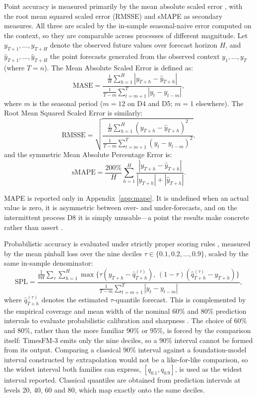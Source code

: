 \documentclass[article]{ajs}
\providecommand{\appendixref}[1]{Appendix~\ref{#1}}
\begin{document}
Point accuracy is measured primarily by the mean absolute scaled error
\citep[MASE;][]{hyndman2006mase}, with the root mean squared scaled error (RMSSE) and sMAPE
as secondary measures. All three are scaled by the in-sample seasonal-naive error computed on
the context, so they are comparable across processes of different magnitude.
Let $y_{T+1}, \dots, y_{T+H}$ denote the observed future values over forecast horizon $H$, and
$\hat{y}_{T+1}, \dots, \hat{y}_{T+H}$ the point forecasts generated from the observed context $y_1, \dots, y_T$
(where $T = n$). The Mean Absolute Scaled Error is defined as:
\begin{equation}
\label{eq:mase}
\text{MASE} = \frac{\frac{1}{H}\sum_{h=1}^H |y_{T+h} - \hat{y}_{T+h}|}{\frac{1}{T-m}\sum_{t=m+1}^T |y_t - y_{t-m}|},
\end{equation}
where $m$ is the seasonal period ($m = 12$ on D4 and D5; $m = 1$ elsewhere). The Root Mean Squared Scaled
Error is similarly:
\begin{equation}
\label{eq:rmsse}
\text{RMSSE} = \sqrt{\frac{\frac{1}{H}\sum_{h=1}^H (y_{T+h} - \hat{y}_{T+h})^2}{\frac{1}{T-m}\sum_{t=m+1}^T (y_t - y_{t-m})^2}},
\end{equation}
and the symmetric Mean Absolute Percentage Error is:
\begin{equation}
\label{eq:smape}
\text{sMAPE} = \frac{200\%}{H} \sum_{h=1}^H \frac{|y_{T+h} - \hat{y}_{T+h}|}{|y_{T+h}| + |\hat{y}_{T+h}|}.
\end{equation}

MAPE is reported only in \appendixref{app:mape}. It is undefined when an actual value is zero,
it is asymmetric between over- and under-forecasts, and on the intermittent process D8 it is
simply unusable---a point the results make concrete rather than assert
\citep{hyndman2006mase, kolassa2016count}.

Probabilistic accuracy is evaluated under strictly proper scoring rules \citep{gneiting2007scoring},
measured by the mean pinball loss over the nine deciles $\tau \in \{0.1, 0.2, \dots, 0.9\}$, scaled by
the same in-sample denominator:
\begin{equation}
\label{eq:spl}
\text{SPL} = \frac{\frac{1}{9H} \sum_{\tau} \sum_{h=1}^H \max\{\tau(y_{T+h} - \hat{q}^{(\tau)}_{T+h}),\, (1-\tau)(\hat{q}^{(\tau)}_{T+h} - y_{T+h})\}}{\frac{1}{T-m}\sum_{t=m+1}^T |y_t - y_{t-m}|},
\end{equation}
where $\hat{q}^{(\tau)}_{T+h}$ denotes the estimated $\tau$-quantile forecast. This is complemented by the
empirical coverage and mean width of the nominal 60\% and 80\% prediction intervals to evaluate
probabilistic calibration and sharpness \citep{gneiting2007calibration}.
The choice of 60\% and 80\%, rather
than the more familiar 90\% or 95\%, is forced by the comparison itself: TimesFM-3 emits only
the nine deciles, so a 90\% interval cannot be formed from its output. Comparing a classical
90\% interval against a foundation-model interval constructed by extrapolation would not be a
like-for-like comparison, so the widest interval both families can express, $[q_{0.1},
q_{0.9}]$, is used as the widest interval reported. Classical quantiles are obtained from
prediction intervals at levels 20, 40, 60 and 80, which map exactly onto the same deciles.
\end{document}
